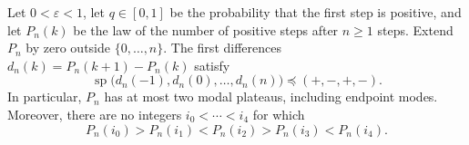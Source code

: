 
\begin{proposition}\label{prop:all-bias-modes}
Let $0<\varepsilon<1$, let $q\in[0,1]$ be the probability that the first
step is positive, and let $P_n(k)$ be the law of the number of positive
steps after $n\ge1$ steps. Extend $P_n$ by zero outside $\{0,\ldots,n\}$.
The first differences $d_n(k)=P_n(k+1)-P_n(k)$ satisfy
\[
 \operatorname{sp}\bigl(d_n(-1),d_n(0),\ldots,d_n(n)\bigr)
 \preceq (+,-,+,-).
\]
In particular, $P_n$ has at most two modal plateaus, including endpoint
modes. Moreover, there are no integers $i_0<\cdots<i_4$ for which
\[
 P_n(i_0)>P_n(i_1)<P_n(i_2)>P_n(i_3)<P_n(i_4).
\]
\end{proposition}

